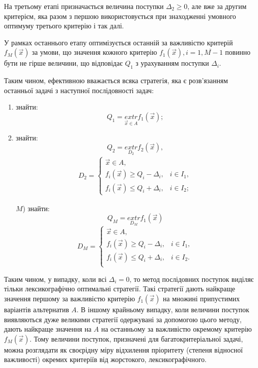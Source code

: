 На третьому етапі призначається величина поступки $\Delta_2 \geq 0$, але вже за другим критерієм, яка разом з першою використовується при знаходженні умовного оптимуму третього критерію і так далі. 

У рамках останнього етапу оптимізується останній за важливістю критерій $f_M(\vec{x})$ за умови, що значення кожного критерію $f_1(\vec{x}), i=\overline{1, M-1}$ повинно бути не гірше величини, що відповідає $Q_1$ з урахуванням поступки $\Delta_i$.

Таким чином, ефективною вважається 	всяка стратегія, яка є розв'язанням останньої задачі з наступної послідовності задач:
\begin{enumerate}[label=\arabic*)]
	\item знайти: 
	\begin{equation}\label{eq:q1}
		Q_1 = \underset{\vec{x} \in A}{extr} f_1(\vec{x});
	\end{equation}
	\item знайти:
	\begin{equation}\label{eq:q2}
		Q_2 = \underset{D_2}{extr} f_2(\vec{x}),
	\end{equation}
	\begin{gather*}
		D_2= \begin{cases} 
			\vec{x} \in A, \\
			f_i(\vec{x}) \geq Q_i - \Delta_i, & i \in I_1, \\
			f_i(\vec{x}) \leq Q_i + \Delta_i, & i \in I_2;  
		\end{cases}
	\end{gather*}
	\dotfill
	\item[$M$)] знайти: 
	\begin{equation}\label{eq:qm}
		Q_M = \underset{D_M}{extr} f_1(\vec{x})
	\end{equation}
	\[
		D_M = \begin{cases}
			\vec{x} \in A, \\
			f_i(\vec{x}) \geq Q_i - \Delta_i, & i \in I_1, \\
			f_i(\vec{x}) \leq Q_i + \Delta_i, & i \in I_2. \\  
		\end{cases}
	\]
\end{enumerate}

Таким чином, у випадку, коли всі $\Delta_i = 0$, то метод послідовних поступок виділяє тільки лексикографічно оптимальні стратегії. 
Такі стратегії дають найкраще значення першому за важливістю критерію $f_1(\vec{x})$ на множині припустимих варіантів альтернатив $A$. 
В іншому крайньому випадку, коли величини поступок виявляються дуже великими стратегії одержувані за допомогою цього методу, дають найкраще значення на $A$ на останньому за важливістю окремому критерію $f_M(\vec{x})$. 
Тому величини поступок, призначені для багатокритеріальної задачі, можна розглядати як 	своєрідну міру відхилення пріоритету (степеня відносної важливості) окремих критеріїв від жорстокого, лексикографічного.

